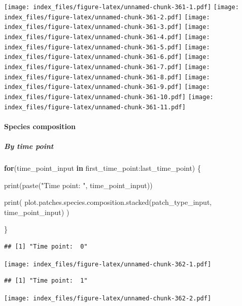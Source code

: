 \documentclass[
]{article}
\newenvironment{Shaded}{\begin{snugshade}}{\end{snugshade}}
\newcommand{\ControlFlowTok}[1]{\textcolor[rgb]{0.13,0.29,0.53}{\textbf{#1}}}
\newcommand{\FunctionTok}[1]{\textcolor[rgb]{0.00,0.00,0.00}{#1}}
\newcommand{\NormalTok}[1]{#1}
\newcommand{\SpecialCharTok}[1]{\textcolor[rgb]{0.00,0.00,0.00}{#1}}
\newcommand{\StringTok}[1]{\textcolor[rgb]{0.31,0.60,0.02}{#1}}
\begin{document}
\texttt{[image: index\_files/figure-latex/unnamed-chunk-361-1.pdf]}
\texttt{[image: index\_files/figure-latex/unnamed-chunk-361-2.pdf]}
\texttt{[image: index\_files/figure-latex/unnamed-chunk-361-3.pdf]}
\texttt{[image: index\_files/figure-latex/unnamed-chunk-361-4.pdf]}
\texttt{[image: index\_files/figure-latex/unnamed-chunk-361-5.pdf]}
\texttt{[image: index\_files/figure-latex/unnamed-chunk-361-6.pdf]}
\texttt{[image: index\_files/figure-latex/unnamed-chunk-361-7.pdf]}
\texttt{[image: index\_files/figure-latex/unnamed-chunk-361-8.pdf]}
\texttt{[image: index\_files/figure-latex/unnamed-chunk-361-9.pdf]}
\texttt{[image: index\_files/figure-latex/unnamed-chunk-361-10.pdf]}
\texttt{[image: index\_files/figure-latex/unnamed-chunk-361-11.pdf]}

\hypertarget{species-composition-2}{%
\paragraph{Species composition}\label{species-composition-2}}

\hypertarget{by-time-point-1}{%
\subparagraph{By time point}\label{by-time-point-1}}

\begin{Shaded}
\begin{Highlighting}[]
\ControlFlowTok{for}\NormalTok{(time\_point\_input }\ControlFlowTok{in}\NormalTok{ first\_time\_point}\SpecialCharTok{:}\NormalTok{last\_time\_point) \{}
  
  \FunctionTok{print}\NormalTok{(}\FunctionTok{paste}\NormalTok{(}\StringTok{"Time point: "}\NormalTok{, time\_point\_input))}
  
  \FunctionTok{print}\NormalTok{(}
    \FunctionTok{plot.patches.species.composition.stacked}\NormalTok{(patch\_type\_input,}
\NormalTok{                                             time\_point\_input)}
\NormalTok{  )}
  
\NormalTok{\}}
\end{Highlighting}
\end{Shaded}

\begin{verbatim}
## [1] "Time point:  0"
\end{verbatim}

\texttt{[image: index\_files/figure-latex/unnamed-chunk-362-1.pdf]}

\begin{verbatim}
## [1] "Time point:  1"
\end{verbatim}

\texttt{[image: index\_files/figure-latex/unnamed-chunk-362-2.pdf]}
\end{document}
